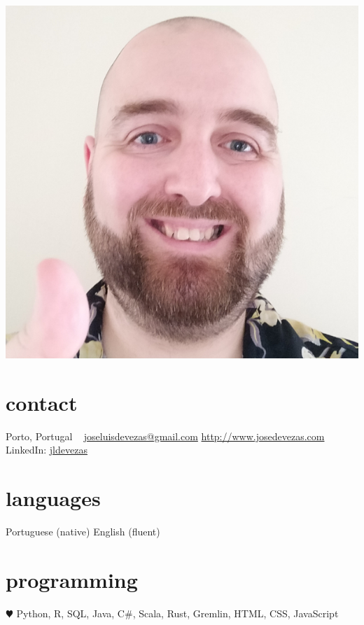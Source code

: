 \documentclass{friggeri-cv}
\begin{document}


\begin{aside} %
\includegraphics[width=\textwidth]{photo.jpg}
%
\section{contact}
Porto, Portugal
~
{\footnotesize \href{mailto:joseluisdevezas@gmail.com}{joseluisdevezas@gmail.com}
\href{http://www.josedevezas.com}{http://www.josedevezas.com} %
LinkedIn: \href{http://pt.linkedin.com/in/jldevezas/en}{jldevezas}}
%
\section{languages}
Portuguese (native)
English (fluent)
%
\section{programming}
{\color{red} $\varheartsuit$} Python, R, SQL, Java, C\#, Scala, Rust, Gremlin, HTML, CSS, JavaScript
\end{aside}
\end{document}
